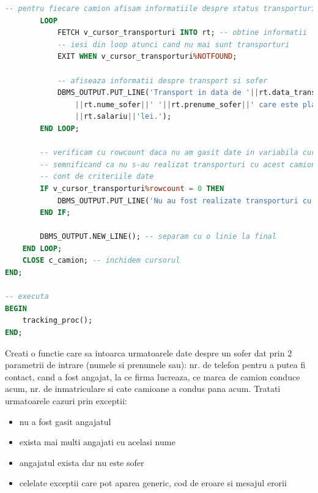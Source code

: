 \documentclass[12pt, a4paper]{article}
\begin{document}
\begin{lstlisting}[language=SQL]
        -- pentru fiecare camion afisam informatiile despre status transporturi
        LOOP
            FETCH v_cursor_transporturi INTO rt; -- obtine informatii 
            -- iesi din loop atunci cand nu mai sunt transporturi
            EXIT WHEN v_cursor_transporturi%NOTFOUND;
            
            -- afiseaza informatii despre transport si sofer
            DBMS_OUTPUT.PUT_LINE('Transport in data de '||rt.data_transport||' realizat de '
                ||rt.nume_sofer||' '||rt.prenume_sofer||' care este platit lunar cu '
                ||rt.salariu||'lei.');
        END LOOP;
        
        -- verificam cu rowcount daca nu am gasit date in variabila cursor
        -- semnificand ca nu s-au realizat transporturi cu acest camion inand 
        -- cont de criteriile date
        IF v_cursor_transporturi%rowcount = 0 THEN
            DBMS_OUTPUT.PUT_LINE('Nu au fost realizate transporturi cu acest camion.');
        END IF;
        
        DBMS_OUTPUT.NEW_LINE(); -- separam cu o linie la final
    END LOOP;
    CLOSE c_camion; -- inchidem cursorul
END;

-- executa
BEGIN
	tracking_proc();
END;
\end{lstlisting}

Creati o functie care sa intoarca urmatoarele date despre un sofer dat prin
2 parametrii de intrare (numele si prenumele sau): nr. de telefon pentru a
putea fi contact, cand a fost angajat, la ce firma lucreaza, ce marca de
camion conduce acum, nr. de inmatriculare si cate camioane a condus pana acum.
Tratati urmatoarele cazuri prin exceptii:
\begin{itemize}
    \item nu a fost gasit angajatul
    \item exista mai multi angajati cu acelasi nume
    \item angajatul exista dar nu este sofer
    \item celelate exceptii care pot aparea generic, cod de eroare si mesajul erorii
\end{itemize}
\end{document}
